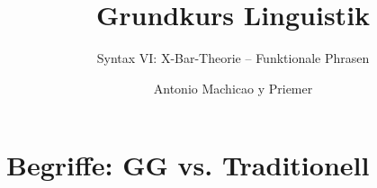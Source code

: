 

\title{Grundkurs Linguistik}

\subtitle{Syntax VI: X-Bar-Theorie -- Funktionale Phrasen}

\author[aMyP]{
	{\small Antonio Machicao y Priemer}
}


\date{ }





\huberlintitlepage




\nocite{Brandt&Co06a}
\nocite{Glueck05a} 
\nocite{Grewendorf&Co91a} 
\nocite{Luedeling2009a} 
\nocite{MuellerS13f} 
\nocite{MuellerS15b}
\nocite{Repp&Co15a} 
\nocite{Stechow&Sternefeld88a}


\section{Begriffe: GG vs. Traditionell}


